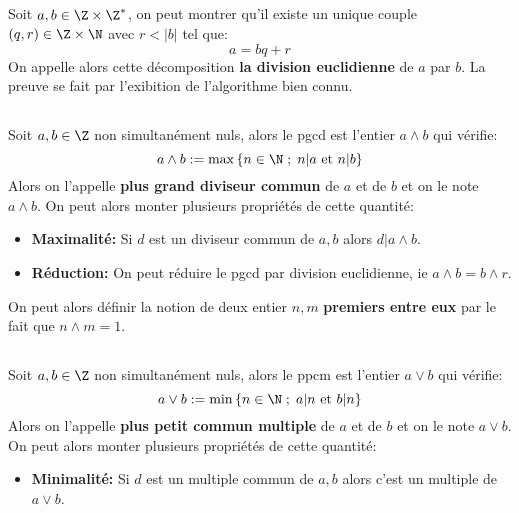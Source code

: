 \subsection*{}
Soit \(a, b \in \Z \times \Z^*\), on peut montrer qu'il existe un unique couple \((q, r) \in \Z \times \N\) avec \(r < |b|\) tel que:
\[ 
    a = bq + r
\]
On appelle alors cette décomposition \textbf{la division euclidienne} de \(a\) par \(b\). La preuve se fait par l'exibition de l'algorithme bien connu.


\subsection*{}
Soit \(a, b \in \Z\) non simultanément nuls, alors le pgcd est l'entier \(a \wedge b\) qui vérifie:
\[ 
    a \wedge b := \max \left\{ n \in \N \; ; \; n | a \text{ et } n | b \right\} 
\]
Alors on l'appelle \textbf{plus grand diviseur commun} de \(a\) et de \(b\) et on le note \(a \wedge b\). On peut alors monter plusieurs propriétés de cette quantité:
\begin{itemize}
   \item \textbf{Maximalité:} Si \( d \) est un diviseur commun de \( a, b \) alors \( d | a \wedge b \).
   \item \textbf{Réduction:} On peut réduire le pgcd par division euclidienne, ie \( a \wedge b = b \wedge r \).
\end{itemize}
On peut alors définir la notion de deux entier \( n, m \) \textbf{premiers entre eux} par le fait que \( n \wedge m = 1 \).

\subsection*{}
Soit \(a, b \in \Z\) non simultanément nuls, alors le ppcm est l'entier \(a \vee b\) qui vérifie:
\[ 
    a \vee b := \min \left\{ n \in \N \; ; \; a | n \text{ et } b | n \right\} 
\]
Alors on l'appelle \textbf{plus petit commun multiple} de \(a\) et de \(b\) et on le note \(a \vee b\). On peut alors monter plusieurs propriétés de cette quantité:
\begin{itemize}
    \item \textbf{Minimalité:} Si \( d \) est un multiple commun de \( a, b \) alors c'est un multiple de \( a \vee b\).
 \end{itemize}

